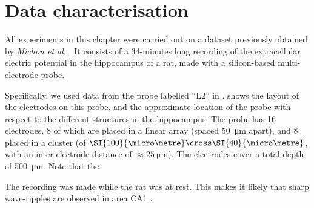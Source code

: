 
\section{Data characterisation}


All experiments in this chapter were carried out on a dataset previously obtained by \emph{Michon et al.} \cite{Michon2016}. It consists of a 34-minutes long recording of the extracellular electric potential in the hippocampus of a rat, made with a silicon-based multi-electrode probe.

Specifically, we used data from the probe labelled ``L2'' in \cite{Michon2016}.  shows the layout of the electrodes on this probe, and the approximate location of the probe with respect to the different structures in the hippocampus. The probe has 16 electrodes, 8 of which are placed in a linear array (spaced \SI{50}{\micro\meter} apart), and 8 placed in a cluster (of $\SI{100}{\micro\metre} \cross \SI{40}{\micro\metre}$, with an inter-electrode distance of $\approx \SI{25}{\micro\metre}$). The electrodes cover a total depth of \SI{500}{\micro\meter}. Note that the 

The recording was made while the rat was at rest. This makes it likely that  sharp wave-ripples are observed in area CA1 \cite{Buzsaki2015}. 





